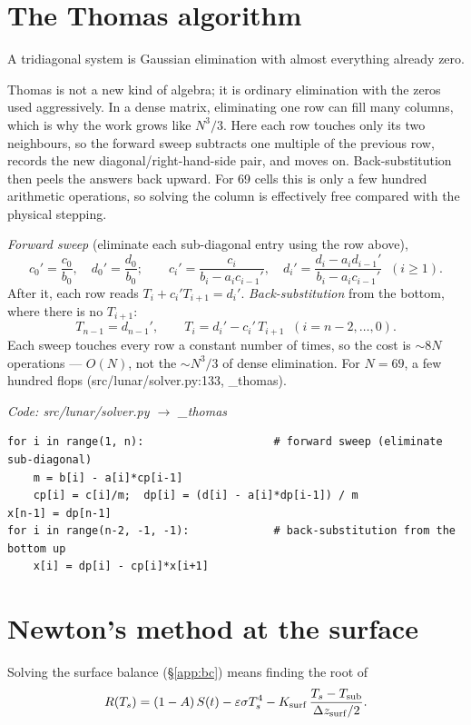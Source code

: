 \documentclass[11pt]{report}
\newcommand{\code}[1]{{\ttfamily\small #1}}
\begin{document}
\section{The Thomas algorithm}\label{app:thomas}
A tridiagonal system is Gaussian elimination with almost everything already zero.

\begin{plain}
Thomas is not a new kind of algebra; it is ordinary elimination with the zeros
used aggressively. In a dense matrix, eliminating one row can fill many columns,
which is why the work grows like $N^3/3$. Here each row touches only its two
neighbours, so the forward sweep subtracts one multiple of the previous row,
records the new diagonal/right-hand-side pair, and moves on. Back-substitution
then peels the answers back upward. For 69 cells this is only a few hundred
arithmetic operations, so solving the column is effectively free compared with
the physical stepping.
\end{plain}

\emph{Forward sweep} (eliminate each sub-diagonal entry using the row above),
\[
c_0'=\frac{c_0}{b_0},\quad d_0'=\frac{d_0}{b_0};\qquad
c_i'=\frac{c_i}{b_i-a_i c_{i-1}'},\quad
d_i'=\frac{d_i-a_i d_{i-1}'}{b_i-a_i c_{i-1}'}\;\;(i\ge1).
\]
After it, each row reads $T_i+c_i' T_{i+1}=d_i'$. \emph{Back-substitution} from
the bottom, where there is no $T_{i+1}$:
\[
T_{n-1}=d_{n-1}',\qquad T_i=d_i'-c_i'\,T_{i+1}\;\;(i=n{-}2,\dots,0).
\]
Each sweep touches every row a constant number of times, so the cost is
$\sim$$8N$ operations --- $O(N)$, not the $\sim N^3/3$ of dense elimination. For
$N=69$, a few hundred flops (\code{src/lunar/solver.py:133}, \code{\_thomas}).

{\small\color{dim}\textit{Code: \code{src/lunar/solver.py} $\to$ \code{\_thomas}}}
\begin{lstlisting}[style=py]
for i in range(1, n):                    # forward sweep (eliminate sub-diagonal)
    m = b[i] - a[i]*cp[i-1]
    cp[i] = c[i]/m;  dp[i] = (d[i] - a[i]*dp[i-1]) / m
x[n-1] = dp[n-1]
for i in range(n-2, -1, -1):             # back-substitution from the bottom up
    x[i] = dp[i] - cp[i]*x[i+1]
\end{lstlisting}

\section{Newton's method at the surface}\label{app:newton}
Solving the surface balance (\S\ref{app:bc}) means finding the root of
\[
R(T_s)=(1-A)\,S(t)-\varepsilon\sigma T_s^4
-K_{\rm surf}\,\frac{T_s-T_{\rm sub}}{\Delta z_{\rm surf}/2}.
\]
\end{document}
